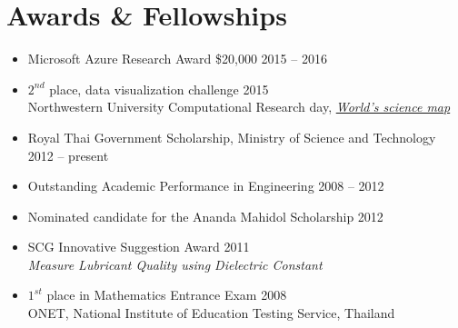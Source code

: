 \section{\sc Awards \& Fellowships}

\begin{itemize}[leftmargin=0cm, label={}]
\itemsep0em

\item Microsoft Azure Research Award \$20,000 \hfill 2015 -- 2016

\item $2^{nd}$ place, data visualization challenge \hfill 2015\\
Northwestern University Computational Research day, {\em \href{http://map.scienceofscience.org}{World's science map}}

\item Royal Thai Government Scholarship, Ministry of Science and Technology \hfill 2012 -- present

\item Outstanding Academic Performance in Engineering	\hfill 2008 -- 2012

\item Nominated candidate for the Ananda Mahidol Scholarship \hfill 2012

\item SCG Innovative Suggestion Award	\hfill 2011\\
{\em Measure Lubricant Quality using Dielectric Constant}

\item $1^{st}$ place in Mathematics Entrance Exam \hfill 2008\\
ONET, National Institute of Education Testing Service, Thailand

\end{itemize}
